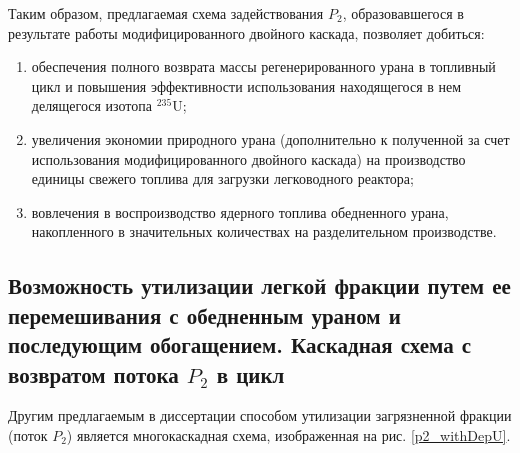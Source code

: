 Таким образом, предлагаемая схема задействования $P_2$, образовавшегося в результате работы модифицированного двойного каскада, позволяет добиться:
\begin{enumerate}
  \item обеспечения полного возврата массы регенерированного урана в топливный цикл и повышения эффективности использования находящегося в нем делящегося изотопа $^{235}$U;
  \item увеличения экономии природного урана (дополнительно к полученной за счет использования модифицированного двойного каскада)  на производство единицы свежего топлива для загрузки легководного реактора;
  \item вовлечения в воспроизводство ядерного топлива обедненного урана, накопленного в значительных количествах на разделительном производстве.
\end{enumerate}

\subsection{Возможность утилизации легкой фракции путем ее перемешивания с обедненным ураном и последующим обогащением. Каскадная схема с возвратом потока $P_2$ в цикл}\label{triple_c}

Другим предлагаемым в диссертации способом утилизации загрязненной фракции (поток $P_2$) является многокаскадная схема, изображенная на рис. \ref{p2_withDepU}.

